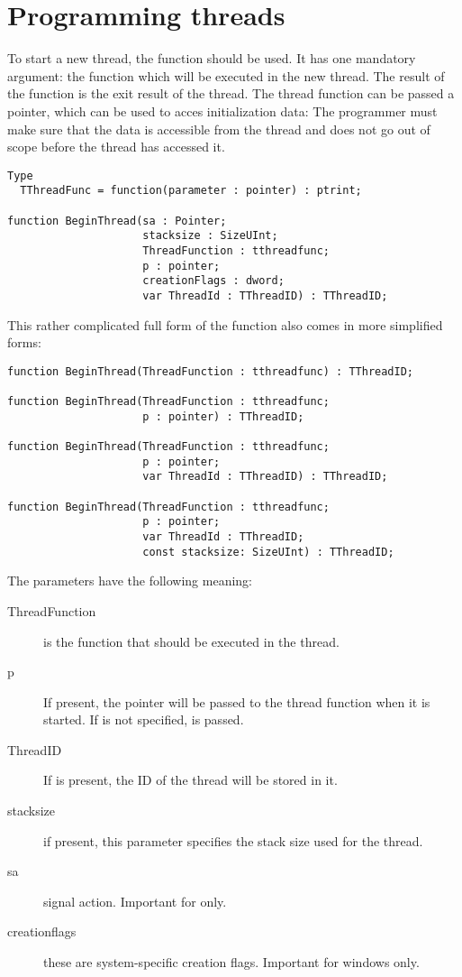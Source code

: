 \section{Programming threads}
To start a new thread, the  function should be used. It has one 
mandatory argument: the function which will be executed in the new thread. The result
of the function is the exit result of the thread. The thread function can be passed a 
pointer, which can be used to acces initialization data: The programmer must make sure 
that the data is accessible from the thread and does not go out of scope before the 
thread has accessed it.
\begin{verbatim}
Type
  TThreadFunc = function(parameter : pointer) : ptrint;

function BeginThread(sa : Pointer;
                     stacksize : SizeUInt;
                     ThreadFunction : tthreadfunc;
                     p : pointer;
                     creationFlags : dword;
                     var ThreadId : TThreadID) : TThreadID;
\end{verbatim}
This rather complicated full form of the function also comes in more simplified
forms:
\begin{verbatim}
function BeginThread(ThreadFunction : tthreadfunc) : TThreadID;

function BeginThread(ThreadFunction : tthreadfunc;
                     p : pointer) : TThreadID;

function BeginThread(ThreadFunction : tthreadfunc;
                     p : pointer; 
                     var ThreadId : TThreadID) : TThreadID;

function BeginThread(ThreadFunction : tthreadfunc;
                     p : pointer;
                     var ThreadId : TThreadID; 
                     const stacksize: SizeUInt) : TThreadID;
\end{verbatim}
The parameters have the following meaning:
\begin{description}
\item[ThreadFunction] is the function that should be executed in the thread.
\item[p] If present, the pointer  will be passed to the thread function 
when it is started. If  is not specified,  is passed. 
\item[ThreadID] If  is present, the ID of the thread will be stored in it. 
\item[stacksize] if present, this parameter specifies the stack size used for the thread.
\item[sa] signal action. Important for \linux only.
\item[creationflags] these are system-specific creation flags. Important for
windows only.
\end{description}

